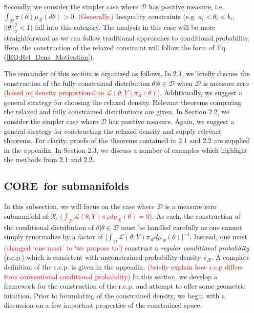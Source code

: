 \documentclass[12 point]{article}
\newcommand{\core}{\textbf{CORE}}
\newcommand{\leo}[1]{\textcolor{red}{ (#1)}}
\begin{document}
Secondly, we consider the simpler case where $\mathcal{D}$ has positive measure, i.e. $\int_\mathcal{D} \pi(\theta) \mu_\mathcal{R}(d\theta) >0.$ \leo{Generally,} Inequality constraints (e.g. $a_i < \theta_i < b_i$, $||\theta||_2^2 < 1$) fall into this category. The analysis in this case will be more straightforward as we can follow traditional approaches to conditional probability. Here, the construction of the relaxed constraint will follow the form of Eq. (\ref{EQ:Rel_Dens_Motivation}).


The remainder of this section is organized as follows.  In 2.1, we briefly discuss the construction of the fully constrained distribution $\theta|\theta \in \mathcal{D}$ when $\mathcal{D}$ is measure zero \leo{based on density
proportional to $\mathcal{L}(\theta; Y)  \pi_\mathcal{R}(\theta)$}.  Additionally, we suggest a general strategy for choosing the relaxed density.  Relevant theorems comparing the relaxed and fully constrained distributions are given. In Section 2.2, we consider the simpler case where $\mathcal{D}$ has positive measure.  Again, we suggest a general strategy for constructing the relaxed density and supply relevant theorems.  For clarity, proofs of the theorems contained in 2.1 and 2.2 are supplied in the appendix. In Section 2.3, we discuss a number of examples which highlight the methods from 2.1 and 2.2.


\subsection{\core\, for submanifolds}

In this subsection, we will focus on the case where $\mathcal{D}$ is a measure zero submanifold of $\mathcal{R}$, \leo{$\int_\mathcal{D}\mathcal{L}(\theta;Y)\pi_\mathcal{R}d\mu_\mathcal{R}(\theta)=0$}. As such, the construction of the conditional distribution of $\theta|\theta \in \mathcal{D}$ must be handled carefully as one cannot simply renormalize by a factor of $\big[\int_\mathcal{D}\mathcal{L}(\theta;Y)\pi_\mathcal{R}d\mu_\mathcal{R}(\theta)\big]^{-1}.$  Instead, one must \leo{changed `one must' to `we propose to'} construct a \emph{regular conditional probability} (r.c.p.) which is consistent with unconstrained probability density $\pi_\mathcal{R}.$  A complete definition of the r.c.p. is given in the appendix. \leo{briefly explain how r.c.p
 differs from conventional conditional probability} In this section, we develop a framework for the construction of the r.c.p. and attempt to offer some geometric intuition.  Prior to formulating of the constrained density, we begin with a discussion on a few important properties of the constrained space.
\end{document}
